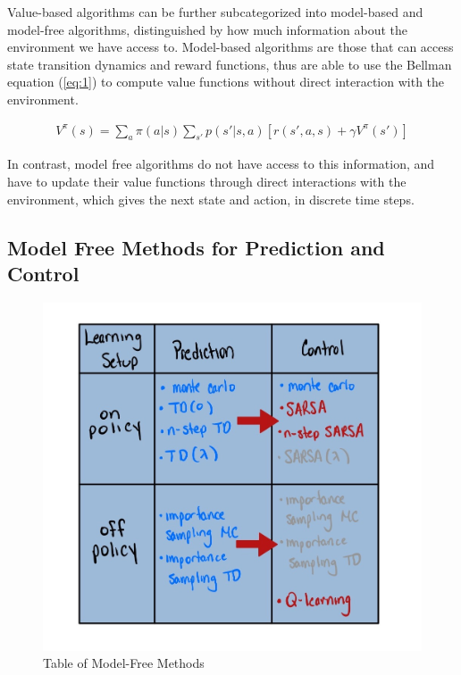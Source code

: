 \documentclass[11pt]{article}
\begin{document}
Value-based algorithms can be further subcategorized into model-based and model-free algorithms, distinguished by how much information about the environment we have access to. Model-based algorithms are those that can access state transition dynamics and reward functions, thus are able to use the Bellman equation (\ref{eq:1}) to compute value functions without direct interaction with the environment.

\begin{align}
\label{eq:1}
    V^{\pi}(s) = \sum_a \pi(a|s)\sum_{s'}p(s'|s,a)[r(s',a,s) + \gamma V^{\pi}(s')]
\end{align}

In contrast, model free algorithms do not have access to this information, and have to update their value functions through direct interactions with the environment, which gives the next state and action, in discrete time steps.

\subsection{Model Free Methods for Prediction and Control}

\begin{figure}[H]
    \centering
    \includegraphics[scale=0.17]{images/Page1 2.jpg}
    \caption{Table of Model-Free Methods}
    \label{fig:modelfree}
\end{figure}
\end{document}
